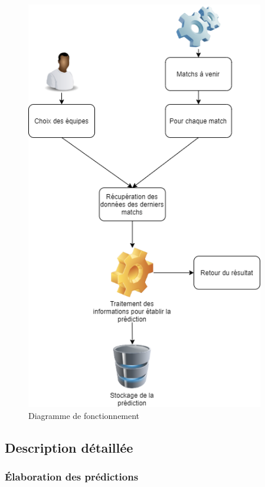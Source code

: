 \documentclass[a4paper,14pt]{extarticle}
\begin{document}
{\begin{figure}[H]
    \centering
    \includegraphics[height=18cm]{../img/schemaFonctionnement.png}
    \caption{Diagramme de fonctionnement}
    \label{fig:schemaFonctionnement}
\end{figure}

\newpage

\subsection{Description détaillée}

\subsubsection{Élaboration des prédictions}
\label{elaborationPredictionCDC}

}
\end{document}
